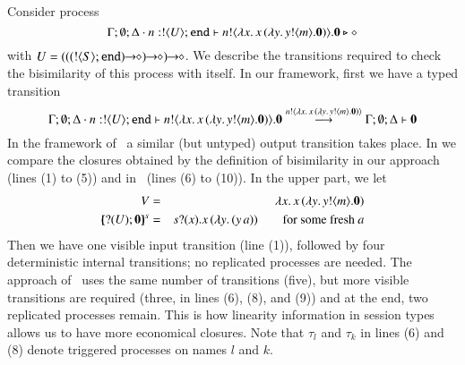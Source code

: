 	Consider process
	$$\Gamma; \emptyset; \Delta \cdot n: ! \langle U \rangle ; \mathtt{end} \vdash n ! \langle \lambda x.\,x\,(\lambda y.\,y ! \langle m \rangle . \mathbf{0}) \rangle . \mathbf{0} \triangleright \diamond$$
	with $U = \shot{(\shot{(\shot{(\btout{S} \tinact)})})}$. 
	We describe the transitions required to check the bisimilarity
	of this process with itself. 
	In our framework, first we have a typed transition
	$$
	\Gamma; \emptyset; \Delta \cdot n: ! \langle U \rangle ; \mathtt{end} \vdash n ! \langle \lambda x.\,x\,(\lambda y.\,y ! \langle m \rangle . \mathbf{0}) \rangle . \mathbf{0} \stackrel{n ! \langle \lambda x.\,x\,(\lambda y.\,y ! \langle m \rangle . \mathbf{0}) \rangle}{\longrightarrow}\Gamma; \emptyset; \Delta \vdash \mathbf{0}
	$$
	In the framework of~\cite{JeffreyR05} a similar (but untyped) output transition takes place.
    In  we compare the closures obtained by the definition of bisimilarity in our approach (lines (1) to (5)) and in~\cite{JeffreyR05} (lines (6) to (10)).
    In the upper part, we let 
    \begin{eqnarray*}
    V & = & \abs{x}{\appl{x}(\abs{y}{\bout{y}{m}} \inact)} \\
	\mapchar{\btinp{U} \inact}{s} & = & \binp{s}{x} \appl{x}{(\abs{y}{(\appl{y}{a}))}}\qquad \text{for some fresh $a$}
	\end{eqnarray*}
	Then we have one visible input transition (line (1)), followed by four deterministic internal transitions; no replicated processes are needed.
	The approach of~\cite{JeffreyR05} uses 
	the same number of transitions (five), but more visible transitions are required
	(three, in lines (6), (8), and (9)) and at the end, two replicated processes remain.
	This is how linearity information in session types allows us to have more economical closures.
	Note that $\tau_l$ and $\tau_k$ in lines (6) and (8) denote triggered processes on names $l$ and $k$.
	
	
	
	
%
%

